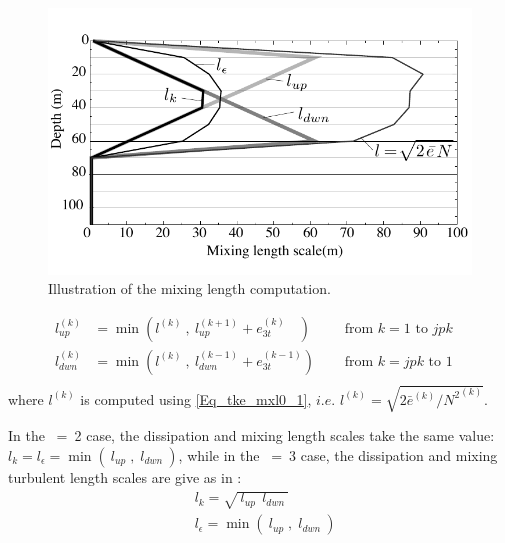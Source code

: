 \begin{figure}[!t] \begin{center}
\includegraphics[width=1.00\textwidth]{./TexFiles/Figures/Fig_mixing_length.pdf}
\caption{ \label{Fig_mixing_length} 
Illustration of the mixing length computation. }
\end{center}  
\end{figure}
\begin{equation} \label{Eq_tke_mxl2}
\begin{aligned}
 l_{up\ \ }^{(k)} &= \min \left(  l^{(k)} \ , \ l_{up}^{(k+1)} + e_{3t}^{(k)}\ \ \ \;  \right)
    \quad &\text{ from $k=1$ to $jpk$ }\ \\
 l_{dwn}^{(k)} &= \min \left(  l^{(k)} \ , \ l_{dwn}^{(k-1)} + e_{3t}^{(k-1)}  \right)   
    \quad &\text{ from $k=jpk$ to $1$ }\ \\
\end{aligned}
\end{equation}
where $l^{(k)}$ is computed using \eqref{Eq_tke_mxl0_1}, 
$i.e.$ $l^{(k)} = \sqrt {2 {\bar e}^{(k)} / {N^2}^{(k)} }$.

In the ~=~2 case, the dissipation and mixing length scales take the same 
value: $ l_k=  l_\epsilon = \min \left(\ l_{up} \;,\;  l_{dwn}\ \right)$, while in the 
~=~3 case, the dissipation and mixing turbulent length scales are give 
as in \citet{Gaspar1990}:
\begin{equation} \label{Eq_tke_mxl_gaspar}
\begin{aligned}
& l_k          = \sqrt{\  l_{up} \ \ l_{dwn}\ }  	\\
& l_\epsilon = \min \left(\ l_{up} \;,\;  l_{dwn}\ \right) 
\end{aligned}
\end{equation}

